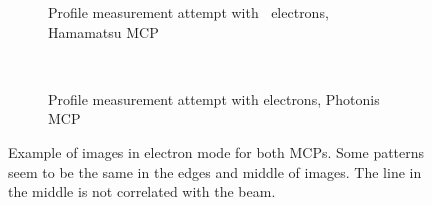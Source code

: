 \begin{figure}[!ht]
	\begin{subfigure}[t]{0.5\textwidth}
		
		\caption{Profile measurement attempt with $\ $ electrons, Hamamatsu MCP}
		\label{}
	\end{subfigure}
	~
	\begin{subfigure}[t]{0.5\textwidth}
		
		\caption{Profile measurement attempt with electrons, Photonis MCP}
		\label{}
	\end{subfigure}
	\caption[Example of images in electron mode]{Example of images in electron mode for both MCPs.
  Some patterns seem to be the same in the edges and middle of images.
  The line in the middle is not correlated with the beam.}
	\label{chap4:electron_MCP}
\end{figure}